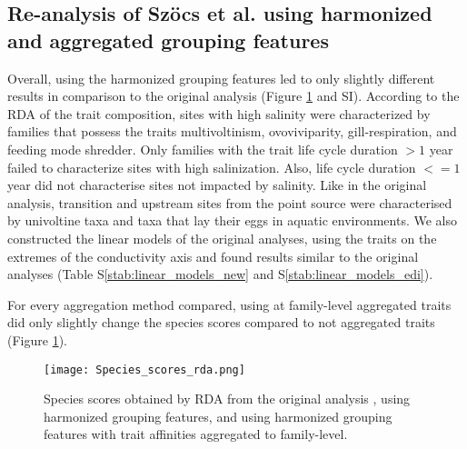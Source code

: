 \documentclass[../Draft_harmonization_paper.tex]{subfiles}
\begin{document}

\subsection*{Re-analysis of Szöcs et al. using harmonized and aggregated grouping features}

Overall, using the harmonized grouping features led to only slightly different results in comparison to the original analysis (Figure \ref{fig:rda_species_scores} and SI). According to the RDA of the trait composition, sites with high salinity were characterized by families that possess the traits multivoltinism, ovoviviparity, gill-respiration, and feeding mode shredder. Only families with the trait life cycle duration $> 1$ year failed to characterize sites with high salinization. Also, life cycle duration $<= 1$ year did not characterise sites not impacted by salinity. Like in the original analysis, transition and upstream sites from the point source were characterised by univoltine taxa and taxa that lay their eggs in aquatic environments. We also constructed the linear models of the original analyses, using the traits on the extremes of the conductivity axis and found results similar to the original analyses (Table S\ref{stab:linear_models_new} and S\ref{stab:linear_models_edi}).

For every aggregation method compared, using at family-level aggregated traits did only slightly change the species scores compared to not aggregated traits (Figure \ref{fig:rda_species_scores}). 

\begin{figure}[H]
    \label{fig:rda_species_scores}
    \centering
    \texttt{[image: Species\_scores\_rda.png]}
    \caption{Species scores obtained by RDA from the original analysis \cite{szocs_effects_2014}, using harmonized grouping features, and using harmonized grouping features with trait affinities aggregated to family-level.}
    \label{fig:rda_species_scores}
\end{figure}
\end{document}
